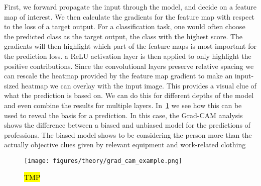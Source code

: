 First, we forward propagate the input through the model, and decide on a feature map of interest. We then calculate the gradients for the feature map with respect to the loss of a target output. For a classification task, one would often choose the predicted class as the target output, the class with the highest score. The gradients will then highlight which part of the feature maps is most important for the prediction loss. a ReLU activation layer is then applied to only highlight the positive contributions. Since the convolutional layers preserve relative spacing we can rescale the heatmap provided by the feature map gradient to make an input-sized heatmap we can overlay with the input image. This provides a visual clue of what the prediction is based on. We can do this for different depths of the model and even combine the results for
multiple layers. In~\cref{fig:grad_cam_example} we see how this can be used to
reveal the basis for a prediction. In this case, the Grad-CAM analysis shows
the difference between a biased and unbiased model for the predictions of professions. The biased model shows to be considering the person more than the actually objective clues given by relevant equipment and work-related clothing


\begin{figure}[H]
  \centering
  \texttt{[image: figures/theory/grad\_cam\_example.png]}
  \caption{\hl{TMP}~\cite{Selvaraju_2019} }
  \label{fig:grad_cam_example}
\end{figure}




